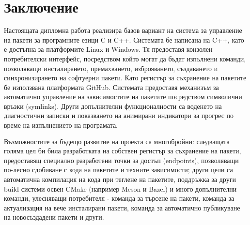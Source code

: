 \chapter*{Заключение}

Настоящата дипломна работа реализира базов вариант на система за управление на
пакети за програмните езици C и C++. Системата бе написана на C++, като е
достъпна за платформите Linux и Windows. Тя предоставя конзолен потребителски
интерфейс, посредством който могат да бъдат изпълнени команди, позволяващи
инсталирането, премахването, изброяването, създаването и синхронизирането на
софтуерни пакети. Като регистър за съхранение на пакетите бе използвана
платформата GitHub. Системата предоставя механизъм за автоматично управление на
зависимостите на пакетите посредством символични връзки (symlinks). Други
допълнителни функционалности са воденето на диагностични записки и показването
на анимирани индикатори за прогрес по време на изпълнението на програмата.

Възможностите за бъдещо развитие на проекта са многобройни: следващата голяма
цел би била разработката на собствен регистър за съхранение на пакети,
предоставящ специално разработени точки за достъп (endpoints), позволяващи
по-лесно сдобиване с кода на пакетите и техните зависимости; други цели са
автоматична компилация на кода при теглене на пакетите, поддръжка за други build
системи освен CMake (например Meson и Bazel) и много допълнителни команди,
улесняващи потребителя - команда за търсене на пакети, команда за актуализация
на вече инсталирани пакети, команда за автоматично публикуване на новосъздадени
пакети и други.
